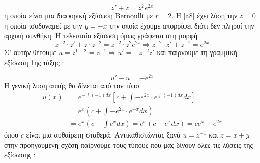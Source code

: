 \documentclass[a4paper,twoside,symmetric]{tufte-book}
\begin{document}
\begin{equation}\label{a8}
z'+z=z^2e^{2x}
\end{equation}
η οποία είναι μια διαφορική εξίσωση Bernoulli με $ r=2 $. Η \eqref{a8} έχει λύση την $ z=0 $ η οποία ισοδυναμεί με την $ y=-x $ την οποία έχουμε απορρίψει διότι δεν πληροί την αρχική συνθήκη. Η τελευταία εξίσωση όμως γράφεται στη μορφή 
\[ z^{-2}\cdot z'+z\cdot z^{-2}=z^{-2}\cdot z^2e^{2x}\Rightarrow z^{-2}\cdot z'+ z^{-1}=e^{2x} \]
Σ' αυτήν θέτουμε $ u=z^{1-2}=z^{-1}\Rightarrow u'=-z^{-2}z' $ και παίρνουμε τη γραμμική εξίσωση 1ης τάξης :

\begin{equation}
u'-u=-e^{2x}
\end{equation}
Η γενική λυση αυτής θα δίνεται από τον τύπο 
\begin{align}
u(x)&=e^{-\int{(-1)dx}}\left[ c+\int{-e^{2x}\cdot e^{\int{(-1)dx}}dx}\right]=\\
&=e^{x}\left(c+\int{-e^{2x}\cdot e^{-x}dx} \right)=\\
&= e^{x}\left(c-\int{e^{x}dx} \right)=e^{x}\left(c-e^{x}dx \right)=ce^x-e^{2x}
\end{align}
όπου $ c $ είναι μια αυθαίρετη σταθερά. Αντικαθιστώντας ξανά $ u=z^{-1} $ και $ z=x+y $ στην προηγούμενη σχέση παίρνουμε τους τύπους που μας δίνουν όλες τις λύσεις της εξίσωσης :
\end{document}
